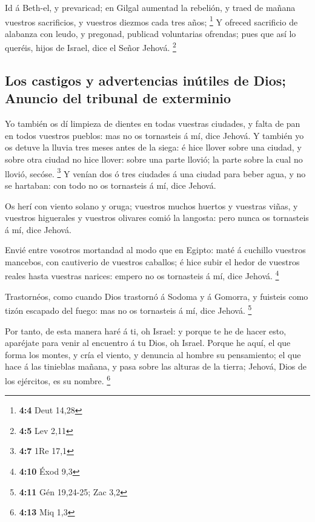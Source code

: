  Id á Beth-el, y prevaricad; en Gilgal aumentad la rebelión,
y traed de mañana vuestros sacrificios, y vuestros diezmos cada tres
años; \footnote{\textbf{4:4} Deut 14,28}  Y ofreced
sacrificio de alabanza con leudo, y pregonad, publicad voluntarias
ofrendas; pues que así lo queréis, hijos de Israel, dice el Señor
Jehová. \footnote{\textbf{4:5} Lev 2,11}

\hypertarget{los-castigos-y-advertencias-inuxfatiles-de-dios-anuncio-del-tribunal-de-exterminio}{%
\subsection{Los castigos y advertencias inútiles de Dios; Anuncio del
tribunal de
exterminio}\label{los-castigos-y-advertencias-inuxfatiles-de-dios-anuncio-del-tribunal-de-exterminio}}

 Yo también os dí limpieza de dientes en todas vuestras
ciudades, y falta de pan en todos vuestros pueblos: mas no os tornasteis
á mí, dice Jehová.  Y también yo os detuve la lluvia tres
meses antes de la siega: é hice llover sobre una ciudad, y sobre otra
ciudad no hice llover: sobre una parte llovió; la parte sobre la cual no
llovió, secóse. \footnote{\textbf{4:7} 1Re 17,1}  Y venían
dos ó tres ciudades á una ciudad para beber agua, y no se hartaban: con
todo no os tornasteis á mí, dice Jehová.

 Os herí con viento solano y oruga; vuestros muchos huertos
y vuestras viñas, y vuestros higuerales y vuestros olivares comió la
langosta: pero nunca os tornasteis á mí, dice Jehová.

 Envié entre vosotros mortandad al modo que en Egipto: maté
á cuchillo vuestros mancebos, con cautiverio de vuestros caballos; é
hice subir el hedor de vuestros reales hasta vuestras narices: empero no
os tornasteis á mí, dice Jehová. \footnote{\textbf{4:10} Éxod 9,3}

 Trastornéos, como cuando Dios trastornó á Sodoma y á
Gomorra, y fuisteis como tizón escapado del fuego: mas no os tornasteis
á mí, dice Jehová. \footnote{\textbf{4:11} Gén 19,24-25; Zac 3,2}

 Por tanto, de esta manera haré á ti, oh Israel: y porque
te he de hacer esto, aparéjate para venir al encuentro á tu Dios, oh
Israel.  Porque he aquí, el que forma los montes, y cría el
viento, y denuncia al hombre su pensamiento; el que hace á las tinieblas
mañana, y pasa sobre las alturas de la tierra; Jehová, Dios de los
ejércitos, es su nombre. \footnote{\textbf{4:13} Miq 1,3}

